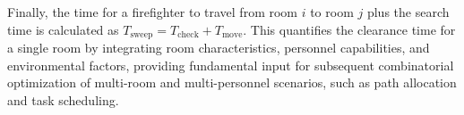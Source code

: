 Finally, the time for a firefighter to travel from room \( i \) to room \( j \) plus the search time is calculated as \(T_{\text{sweep}} = T_{\text{check}} + T_{\text{move}} \). This quantifies the clearance time for a single room by integrating room characteristics, personnel capabilities, and environmental factors, providing fundamental input for subsequent combinatorial optimization of multi-room and multi-personnel scenarios, such as path allocation and task scheduling.

\vspace{-0.1cm}%
